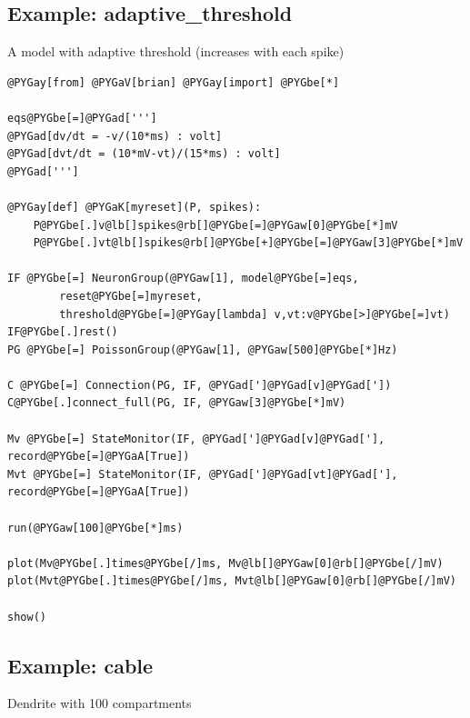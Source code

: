 \documentclass[letterpaper,10pt]{manual}
\begin{document}
\hypertarget{index-27}{}\subsection{Example: adaptive\_threshold}

A model with adaptive threshold (increases with each spike)

\begin{Verbatim}[commandchars=@\[\]]
@PYGay[from] @PYGaV[brian] @PYGay[import] @PYGbe[*]

eqs@PYGbe[=]@PYGad[''']
@PYGad[dv/dt = -v/(10*ms) : volt]
@PYGad[dvt/dt = (10*mV-vt)/(15*ms) : volt]
@PYGad[''']

@PYGay[def] @PYGaK[myreset](P, spikes):
    P@PYGbe[.]v@lb[]spikes@rb[]@PYGbe[=]@PYGaw[0]@PYGbe[*]mV
    P@PYGbe[.]vt@lb[]spikes@rb[]@PYGbe[+]@PYGbe[=]@PYGaw[3]@PYGbe[*]mV

IF @PYGbe[=] NeuronGroup(@PYGaw[1], model@PYGbe[=]eqs,
        reset@PYGbe[=]myreset,
        threshold@PYGbe[=]@PYGay[lambda] v,vt:v@PYGbe[>]@PYGbe[=]vt)
IF@PYGbe[.]rest()
PG @PYGbe[=] PoissonGroup(@PYGaw[1], @PYGaw[500]@PYGbe[*]Hz)

C @PYGbe[=] Connection(PG, IF, @PYGad[']@PYGad[v]@PYGad['])
C@PYGbe[.]connect_full(PG, IF, @PYGaw[3]@PYGbe[*]mV)

Mv @PYGbe[=] StateMonitor(IF, @PYGad[']@PYGad[v]@PYGad['], record@PYGbe[=]@PYGaA[True])
Mvt @PYGbe[=] StateMonitor(IF, @PYGad[']@PYGad[vt]@PYGad['], record@PYGbe[=]@PYGaA[True])

run(@PYGaw[100]@PYGbe[*]ms)

plot(Mv@PYGbe[.]times@PYGbe[/]ms, Mv@lb[]@PYGaw[0]@rb[]@PYGbe[/]mV)
plot(Mvt@PYGbe[.]times@PYGbe[/]ms, Mvt@lb[]@PYGaw[0]@rb[]@PYGbe[/]mV)

show()
\end{Verbatim}

\resetcurrentobjects
{}

\hypertarget{index-28}{}\subsection{Example: cable}

Dendrite with 100 compartments
\end{document}
